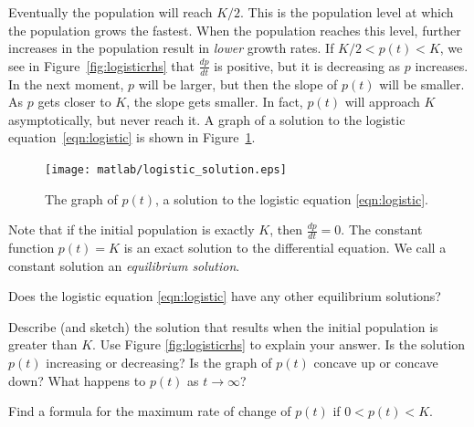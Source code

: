 Eventually the population will reach $K/2$.  This is the population
level at which the population grows the fastest.
When the population reaches this level, further increases in the
population result in \emph{lower} growth rates.
If $K/2 < p(t) < K$, we see in
Figure~\ref{fig:logisticrhs} that $\frac{dp}{dt}$ is positive, but it is
decreasing as $p$ increases.  In the next moment, $p$ will be larger,
but then the slope of $p(t)$ will be smaller.
As $p$ gets closer to $K$, the slope gets smaller.
In fact, $p(t)$ will approach $K$ asymptotically, but never reach it.
A graph of a solution to the logistic equation~\eqref{eqn:logistic} is
shown in Figure~\ref{fig:logisticsol}.
\begin{figure}
\centerline{\texttt{[image: matlab/logistic\_solution.eps]}} 
\caption{The graph of $p(t)$, a solution to the logistic
equation \eqref{eqn:logistic}.}
\label{fig:logisticsol}
\end{figure}


Note that if the initial population is exactly $K$, then
$\frac{dp}{dt} = 0$.  The constant function $p(t)=K$ is an
exact solution to the differential equation.
We call a constant solution an
\emph{equilibrium solution}.

\newpage

\begin{exercises}
\begin{exercise}
Does the logistic equation \eqref{eqn:logistic} have any other
equilibrium solutions?
\end{exercise}
\begin{exercise}
Describe (and sketch) the solution that
results when the initial population is greater than $K$.
Use Figure \ref{fig:logisticrhs} to explain your answer.
Is the solution $p(t)$ increasing or decreasing?
Is the graph of $p(t)$ concave up or concave down?
What happens to $p(t)$ as $t\rightarrow\infty$?
\end{exercise}
\begin{exercise}
Find a formula for the maximum rate of change
of $p(t)$ if $0 < p(t) < K$.
\end{exercise}
\end{exercises}

\newpage

